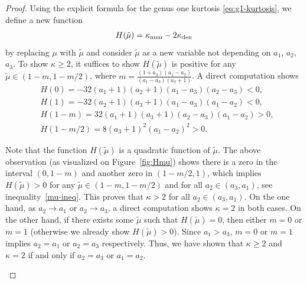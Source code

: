 \documentclass[10pt,a4paper]{amsart}
\numberwithin{equation}{section}
\def\ra{\rightarrow}
\begin{document}
\begin{proof}
Using the explicit formula for the genus one kurtosis \eqref{eq:g1-kurtosis}, we define a new function
\begin{align*}
H(\tilde \mu)=\kappa_{\rm num}-2\kappa_{\rm den}
\end{align*}
by replacing $\mu$ with $\tilde \mu$ and consider $\tilde \mu$ as a new variable not depending on $a_1$, $a_2$, $a_3$. To show $\kappa\geq 2$, it suffices to show $H(\tilde \mu)$ is positive for any $\tilde \mu\in (1-m,1-m/2)$, where $m=\frac{(1+a_3)(a_1-a_2)}{(a_1-a_3)(a_2+1)}$. A direct computation shows
\begin{align*}
&H(0)=-32(a_1+1)(a_2+1)(a_1-a_3)(a_2-a_3)<0,\\
&H(1)=-32(a_2+1)(a_3+1)(a_1-a_3)(a_1-a_2)<0,\\
&H(1-m)=32(a_1+1)(a_3+1)(a_2-a_3)(a_1-a_2)>0,\\
&H(1-m/2)=8(a_3+1)^2(a_1-a_2)^2>0.
\end{align*}


Note that the function $H(\tilde \mu)$ is a quadratic function of $\tilde \mu$. The above observation (as visualized on Figure~\ref{fig:Hmu}) shows there is a zero in the interval $(0,1-m)$ and another zero in $(1-m/2,1)$, which implies $H(\tilde \mu)>0$
for any $\tilde \mu \in (1-m,1-m/2)$ and for all $a_2\in (a_3,a_1)$,
see inequality~\eqref{mu-ineq}.
This proves that $\kappa>2$ for all $a_2\in (a_3,a_1)$. On the one hand, as $a_2\ra a_1$ or $a_2\ra a_3$, a direct computation shows $\kappa=2$
in both cases.
On the other hand, if there exists some $\tilde \mu$ such that $H(\tilde \mu)=0$, then either $m=0$ or $m=1$ (otherwise we already show $H(\tilde \mu)>0$). Since $a_1>a_3$, $m=0$ or $m=1$ implies $a_2=a_1$ or $a_2=a_3$ respectively. Thus, we have shown that $\kappa\geq 2$ and $\kappa=2$ if and only if $a_2=a_3$ or $a_1=a_2$.

\begin{figure}[ht]
    \centering
\end{figure}
\end{proof}
\end{document}
